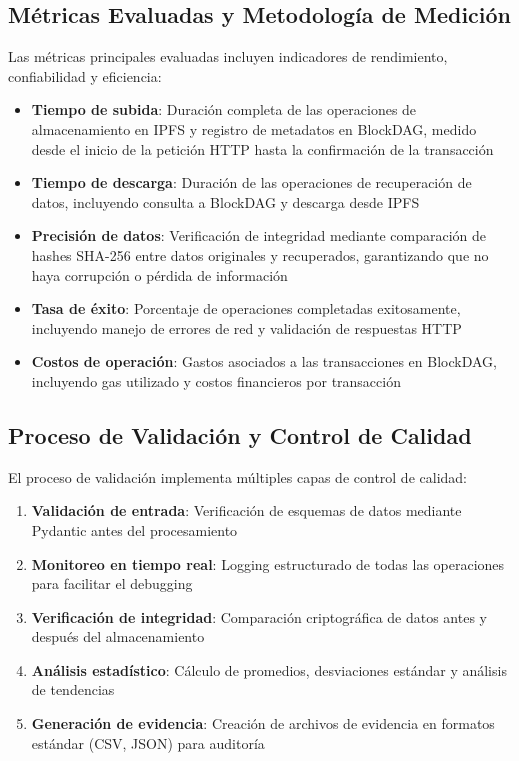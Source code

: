 \documentclass[onecolumn]{article}
\begin{document}
\subsection{Métricas Evaluadas y Metodología de Medición}

Las métricas principales evaluadas incluyen indicadores de rendimiento, confiabilidad y eficiencia:

\begin{itemize}
    \item \textbf{Tiempo de subida}: Duración completa de las operaciones de almacenamiento en IPFS y registro de metadatos en BlockDAG, medido desde el inicio de la petición HTTP hasta la confirmación de la transacción
    \item \textbf{Tiempo de descarga}: Duración de las operaciones de recuperación de datos, incluyendo consulta a BlockDAG y descarga desde IPFS
    \item \textbf{Precisión de datos}: Verificación de integridad mediante comparación de hashes SHA-256 entre datos originales y recuperados, garantizando que no haya corrupción o pérdida de información
    \item \textbf{Tasa de éxito}: Porcentaje de operaciones completadas exitosamente, incluyendo manejo de errores de red y validación de respuestas HTTP
    \item \textbf{Costos de operación}: Gastos asociados a las transacciones en BlockDAG, incluyendo gas utilizado y costos financieros por transacción
\end{itemize}

\subsection{Proceso de Validación y Control de Calidad}

El proceso de validación implementa múltiples capas de control de calidad:

\begin{enumerate}
    \item \textbf{Validación de entrada}: Verificación de esquemas de datos mediante Pydantic antes del procesamiento
    \item \textbf{Monitoreo en tiempo real}: Logging estructurado de todas las operaciones para facilitar el debugging
    \item \textbf{Verificación de integridad}: Comparación criptográfica de datos antes y después del almacenamiento
    \item \textbf{Análisis estadístico}: Cálculo de promedios, desviaciones estándar y análisis de tendencias
    \item \textbf{Generación de evidencia}: Creación de archivos de evidencia en formatos estándar (CSV, JSON) para auditoría
\end{enumerate}
\end{document}
